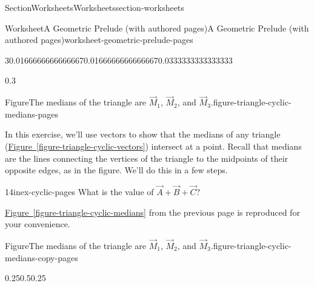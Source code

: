 \documentclass[oneside,10pt,]{article}
\newcommand{\xreffont}{\relax}
\numberwithin{equation}{section}
\begin{document}
\begin{sectionptx}{Section}{Worksheets}{}{Worksheets}{}{}{section-worksheets}
\begin{worksheet-subsection}{Worksheet}{A Geometric Prelude (with authored pages)}{}{A Geometric Prelude (with authored pages)}{}{}{worksheet-geometric-prelude-pages}
\begin{introduction}{}
\begin{sidebyside}{3}{0.0166666666666667}{0.0166666666666667}{0.0333333333333333}
\begin{sbspanel}{0.3}
\begin{panelfigureptx}{Figure}{The medians of the triangle are \(\vec{M}_1\), \(\vec{M}_2\), and \(\vec{M}_3\).}{figure-triangle-cyclic-medians-pages}{}
{%
}%
\tcblower
\end{panelfigureptx}%
\end{sbspanel}%
\end{sidebyside}%
\par
In this exercise, we'll use vectors to show that the medians of any triangle (\hyperref[figure-triangle-cyclic-vectors]{Figure~{\xreffont\ref{figure-triangle-cyclic-vectors}}}) intersect at a point. Recall that medians are the lines connecting the vertices of the triangle to the midpoints of their opposite edges, as in the figure. We'll do this in a few steps.%
\end{introduction}%
\begin{divisionexercise}{1}{}{4in}{ex-cyclic-pages}%
What is the value of \(\vec{A} + \vec{B} + \vec{C}\)?%
\end{divisionexercise}%
\clearpage
\hyperref[figure-triangle-cyclic-medians]{Figure~{\xreffont\ref{figure-triangle-cyclic-medians}}} from the previous page is reproduced for your convenience.%
\begin{figureptx}{Figure}{The medians of the triangle are \(\vec{M}_1\), \(\vec{M}_2\), and \(\vec{M}_3\).}{figure-triangle-cyclic-medians-copy-pages}{}%
\begin{image}{0.25}{0.5}{0.25}{}%
\end{image}
\end{figureptx}
\end{worksheet-subsection}
\end{sectionptx}
\end{document}
